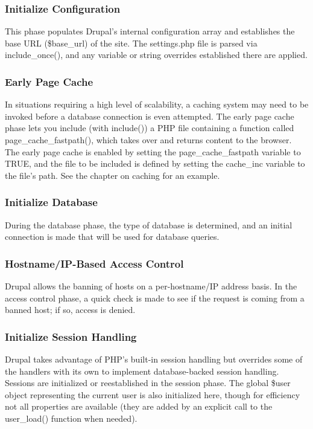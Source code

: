 \subsubsection{Initialize Configuration}

This phase populates Drupal’s internal configuration array and establishes the base URL (\$base\_url) of the site. The settings.php file is parsed via include\_once(), and any variable or string overrides established there are applied.

\subsubsection{Early Page Cache}

In situations requiring a high level of scalability, a caching system may need to be invoked before a database connection is even attempted. The early page cache phase lets you include (with include()) a PHP file containing a function called page\_cache\_fastpath(), which takes over and returns content to the browser. The early page cache is enabled by setting the page\_cache\_fastpath variable to TRUE, and the file to be included is defined by setting the cache\_inc variable to the file’s path. See the chapter on caching for an example.

\subsubsection{Initialize Database}

During the database phase, the type of database is determined, and an initial connection is made that will be used for database queries.

\subsubsection{Hostname/IP-Based Access Control}

Drupal allows the banning of hosts on a per-hostname/IP address basis. In the access control phase, a quick check is made to see if the request is coming from a banned host; if so, access is denied.

\subsubsection{Initialize Session Handling}

Drupal takes advantage of PHP’s built-in session handling but overrides some of the handlers with its own to implement database-backed session handling. Sessions are initialized or reestablished in the session phase. The global \$user object representing the current user is also initialized here, though for efficiency not all properties are available (they are added by an explicit call to the user\_load() function when needed).

